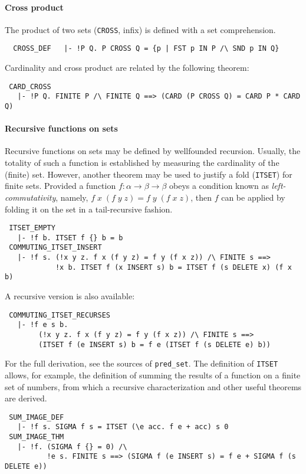 \paragraph{Cross product}
The product of two sets ({\small\verb+CROSS+}, infix) is defined
with a set comprehension.
%
{\small
\begin{verbatim}
  CROSS_DEF   |- !P Q. P CROSS Q = {p | FST p IN P /\ SND p IN Q}
\end{verbatim}}
%
\noindent Cardinality and cross product are related by the following theorem:
{\small
\begin{verbatim}
 CARD_CROSS
   |- !P Q. FINITE P /\ FINITE Q ==> (CARD (P CROSS Q) = CARD P * CARD Q)
\end{verbatim}}
%
\paragraph{Recursive functions on sets}

Recursive functions on sets may be defined by wellfounded
recursion. Usually, the totality of such a function is established by
measuring the cardinality of the (finite) set. However, another
theorem may be used to justify a fold ({\small\verb+ITSET+}) for finite sets.
Provided a function $f:\alpha\to\beta\to\beta$ obeys a condition
known as \emph{left-commutativity}, namely, $f\;x\;(f\;y\;z) =
f\;y\;(f\;x\;z)$, then $f$ can be applied by folding it on the set
in a tail-recursive fashion.
%
{\small
\begin{verbatim}
 ITSET_EMPTY
   |- !f b. ITSET f {} b = b
 COMMUTING_ITSET_INSERT
   |- !f s. (!x y z. f x (f y z) = f y (f x z)) /\ FINITE s ==>
            !x b. ITSET f (x INSERT s) b = ITSET f (s DELETE x) (f x b)
\end{verbatim}}
%
\noindent A recursive version is also available:
{\small
\begin{verbatim}
 COMMUTING_ITSET_RECURSES
   |- !f e s b.
        (!x y z. f x (f y z) = f y (f x z)) /\ FINITE s ==>
        (ITSET f (e INSERT s) b = f e (ITSET f (s DELETE e) b))
\end{verbatim}}
%
For the full derivation, see the sources of {\small\verb+pred_set+}.
The definition of {\small\verb+ITSET+} allows, for example, the
definition of summing the results of a function on a finite set of numbers,
from which a recursive characterization and other useful theorems are derived.
%
{\small
\begin{verbatim}
 SUM_IMAGE_DEF
   |- !f s. SIGMA f s = ITSET (\e acc. f e + acc) s 0
 SUM_IMAGE_THM
   |- !f. (SIGMA f {} = 0) /\
          !e s. FINITE s ==> (SIGMA f (e INSERT s) = f e + SIGMA f (s DELETE e))
\end{verbatim}}

